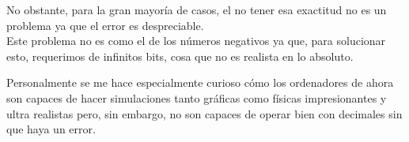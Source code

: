 \documentclass[12pt]{article}
\begin{document}
No obstante, para la gran mayoría de casos, el no tener esa exactitud no es un problema ya que el error es despreciable.
\\

Este problema no es como el de los números negativos ya que, para solucionar esto, requerimos de infinitos bits, cosa que no es realista en lo absoluto.

Personalmente se me hace especialmente curioso cómo los ordenadores de ahora son capaces de hacer simulaciones tanto gráficas como físicas impresionantes y ultra realistas pero, sin embargo, no son capaces de operar bien con decimales sin que haya un error.
\end{document}

